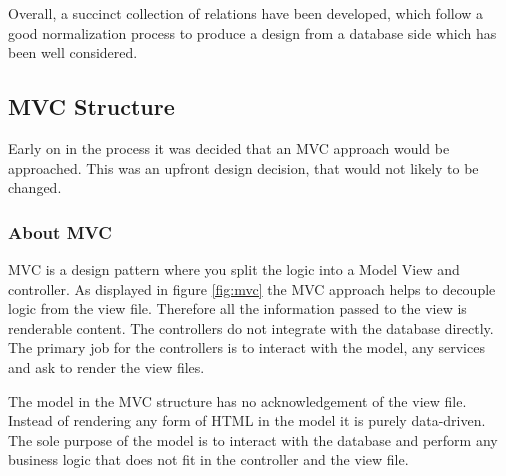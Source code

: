 Overall, a succinct collection of relations have been developed, which follow a good normalization process to produce a design from a database side which has been well considered.



\subsection{MVC Structure}
Early on in the process it was decided that an MVC approach would be approached. This was an upfront design decision, that would not likely to be changed.

\subsubsection{About MVC}
MVC is a design pattern where you split the logic into a Model View and controller. As displayed in figure \ref{fig:mvc} the MVC approach helps to decouple logic from the view file. Therefore all the information passed to the view is renderable content. The controllers do not integrate with the database directly. The primary job for the controllers is to interact with the model, any services and ask to render the view files.

The model in the MVC structure has no acknowledgement of the view file. Instead of rendering any form of HTML in the model it is purely data-driven. The sole purpose of the model is to interact with the database and perform any business logic that does not fit in the controller and the view file.

